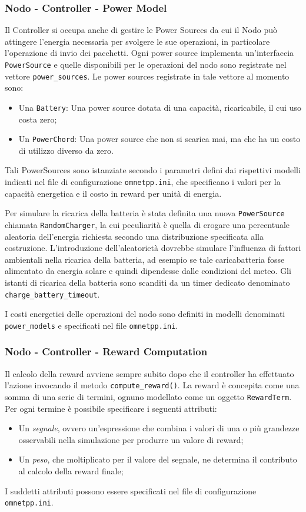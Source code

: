 \documentclass[conference]{IEEEtran}
\newcommand{\code}[1]{\texttt{#1}}
\begin{document}
\subsubsection{Nodo - Controller - Power Model}
Il Controller si occupa anche di gestire le Power Sources da cui il Nodo può attingere
l'energia necessaria per svolgere le sue operazioni, in particolare l'operazione di 
invio dei pacchetti. Ogni power source implementa un'interfaccia \code{PowerSource}
e quelle disponibili per le operazioni del nodo sono registrate nel vettore
\code{power\_sources}. Le power sources registrate in tale vettore al momento sono: 
\begin{itemize}
    \item Una \code{Battery}: Una power source dotata di una capacità, ricaricabile, il
    cui uso costa zero;
    \item Un \code{PowerChord}: Una power source che non si scarica mai, ma che ha un
    costo di utilizzo diverso da zero.
\end{itemize}
Tali PowerSources sono istanziate secondo i parametri defini dai rispettivi modelli
indicati nel file di configurazione \code{omnetpp.ini}, che specificano
i valori per la capacità energetica e il costo in reward per unità di energia.

Per simulare la ricarica della batteria è stata definita una nuova \code{PowerSource}
chiamata \code{RandomCharger}, la cui peculiarità è quella di erogare una percentuale
aleatoria dell'energia richiesta secondo una distribuzione specificata alla costruzione.
L'introduzione dell'aleatorietà dovrebbe simulare l'influenza di fattori ambientali
nella ricarica della batteria, ad esempio se tale caricabatteria fosse alimentato da
energia solare e quindi dipendesse dalle condizioni del meteo. Gli istanti di ricarica
della batteria sono scanditi da un timer dedicato denominato
\code{charge\_battery\_timeout}.

I costi energetici delle operazioni del nodo sono definiti in modelli 
denominati \code{power\_models} e specificati nel file \code{omnetpp.ini}. 

\subsubsection{Nodo - Controller - Reward Computation}

Il calcolo della reward avviene sempre subito dopo che il controller ha effettuato l'azione
invocando il metodo \code{compute\_reward()}.
La reward è concepita come una somma di una serie di termini, ognuno
modellato come un oggetto \code{RewardTerm}. Per ogni termine è possibile specificare
i seguenti attributi:
\begin{itemize}
    \item Un \textit{segnale}, ovvero un'espressione che combina i valori di una o più grandezze osservabili nella simulazione per produrre un valore di reward;
    \item Un \textit{peso}, che moltiplicato per il valore del segnale, ne determina il
    contributo al calcolo della reward finale;
\end{itemize}
I suddetti attributi possono essere specificati nel file di configurazione
\code{omnetpp.ini}.
\end{document}
